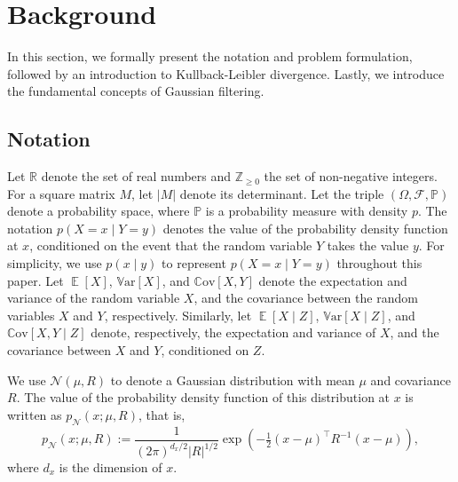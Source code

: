 \documentclass[preprint,3p,times]{elsarticle}
\DeclareMathOperator{\E}{\mathbb{E}}
\newcommand{\Var}{\mathbb{V}\mathrm{ar}}
\newcommand{\Cov}{\mathbb{C}\mathrm{ov}}
\newcommand{\pdense}{p}
\begin{document}
\section{Background}
\label{sec:background}
In this section, we formally present the notation and problem formulation, followed by an introduction to Kullback-Leibler divergence. Lastly, we introduce the fundamental concepts of Gaussian filtering.

\subsection{Notation}
Let $\mathbb{R}$ denote the set of real numbers and $\mathbb{Z}_{\geq 0}$ the set of non-negative integers. For a square matrix $M$, let $\lvert M \rvert$ denote its determinant. Let the triple $(\Omega,\mathcal{F},\mathbb{P})$ denote a probability space, where $\mathbb{P}$ is a probability measure with density $\pdense$. The notation $p(X = x \mid Y = y)$ denotes the value of the probability density function at $x$, conditioned on the event that the random variable $Y$ takes the value $y$. For simplicity, we use $p(x \mid y)$ to represent $p(X = x \mid Y = y)$ throughout this paper. Let $\E[X]$, $\Var[X]$, and $\Cov[X, Y]$ denote the expectation and variance of the random variable $X$, and the covariance between the random variables $X$ and $Y$, respectively. Similarly, let $\E[X \mid Z]$, $\Var[X \mid Z]$, and $\Cov[X, Y \mid Z]$ denote, respectively, the expectation and variance of $X$, and the covariance between $X$ and $Y$, conditioned on $Z$.

We use $\mathcal{N}(\mu,R)$ to denote a Gaussian distribution with mean $\mu$ and covariance $R$. The value of the probability density function of this distribution at $x$ is written as $\pdense_\mathcal{N}(x;\mu,R)$, that is,
\[
\pdense_\mathcal{N}(x;\mu,R) := \frac{1}{(2\pi)^{d_x/2}\lvert R \rvert^{1/2}} 
\exp\!\left(-\tfrac{1}{2}(x-\mu)^\top R^{-1}(x-\mu)\right),
\]
where $d_x$ is the dimension of $x$. 
\end{document}
